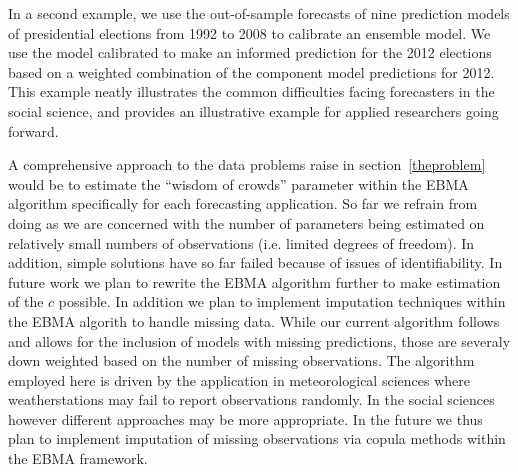 \documentclass[12pt,fullpage,endnotes]{article}
\begin{document}
In a second example, we use the out-of-sample forecasts of nine
prediction models of presidential elections from 1992 to 2008 to
calibrate an ensemble model. We use the model calibrated to make an
informed prediction for the 2012 elections based on a weighted
combination of the component model predictions for 2012. This example
neatly illustrates the common difficulties facing forecasters in the
social science, and provides an illustrative example for applied
researchers going forward.

A comprehensive approach to the data problems raise in
section~\ref{theproblem} would be to estimate the ``wisdom of crowds''
parameter within the EBMA algorithm specifically for each forecasting
application. So far we refrain from doing as we are concerned with the
number of parameters being estimated on relatively small numbers of
observations (i.e. limited degrees of freedom). In addition, simple
solutions have so far failed because of issues of identifiability. In
future work we plan to rewrite the EBMA algorithm further to make
estimation of the $c$ possible.
In addition we plan to implement imputation techniques within the EBMA
algorith to handle missing data. While our current algorithm follows
\citet{Fraley:2010} and allows for the inclusion of models with
missing predictions, those are severaly down weighted based on the
number of missing observations. The algorithm employed here is driven
by the application in meteorological sciences where weatherstations
may fail to report observations randomly. In the social sciences
however different approaches may be more appropriate. In the future we
thus plan to implement imputation of missing observations via copula
methods within the EBMA framework.

\singlespacing




 \newpage
 \appendix

\doublespacing
\end{document}
